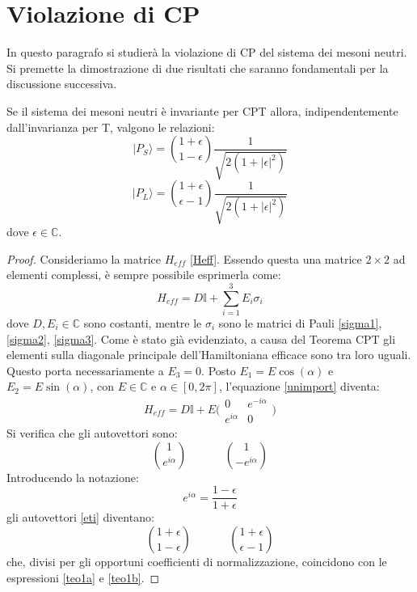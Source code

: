 \section{Violazione di CP}
\noindent
In questo paragrafo si studierà la violazione di CP del sistema dei mesoni neutri. Si premette la dimostrazione di due risultati
che saranno fondamentali per la discussione successiva.
\begin{teorema}
 Se il sistema dei mesoni neutri è invariante per CPT allora, indipendentemente dall'invarianza per T, valgono le relazioni:
\begin{equation}\label{teo1a}
 |P_S\rangle = \binom{1+\epsilon}{1-\epsilon} \frac{1}{\sqrt{2(1+{|\epsilon|}^2)}}
\end{equation}
\begin{equation}\label{teo1b}
 |P_L\rangle = \binom{1+\epsilon}{\epsilon-1} \frac{1}{\sqrt{2(1+{|\epsilon|}^2)}}
\end{equation}
dove $\epsilon \in \mathbb{C}$.
\end{teorema}
\begin{proof}
Consideriamo la matrice $H_{eff}$ \eqref{Heff}. Essendo questa una matrice $2 \times 2$ ad elementi complessi, è sempre possibile esprimerla come:
\begin{equation} \label{unimport}
 H_{eff} = D\mathbb{I} + \sum_{i=1}^{3}E_i\sigma_i
\end{equation}
dove $D, E_i \in \mathbb{C}$ sono costanti, mentre le $\sigma_i$ sono le matrici di Pauli \eqref{sigma1}, \eqref{sigma2}, \eqref{sigma3}.
Come è stato già evidenziato, a causa del Teorema CPT gli elementi sulla diagonale principale dell'Hamiltoniana efficace sono tra loro uguali.
Questo porta necessariamente a $E_3 = 0$.
Posto $E_1 = E \cos (\alpha)$ e $E_2 = E\sin(\alpha)$, con $E \in \mathbb{C}$ e $\alpha \in [0,2\pi]$, l'equazione \eqref{unimport} diventa:
\begin{equation}
 H_{eff} = D\mathbb{I} + E \Bigg(\begin{matrix} 0 & e^{-i\alpha} \\ e^{i\alpha} & 0 \end{matrix}\Bigg)
\end{equation}
Si verifica che gli autovettori sono:
\begin{equation}\label{eti}
 \binom{1}{e^{i\alpha}}\ \ \ \ \ \ \ \ \ \ \ \ \ \ \ \binom{1}{-e^{i\alpha}}
\end{equation}
Introducendo la notazione:
\begin{equation}
 e^{i\alpha} = \frac{1 - \epsilon}{1+\epsilon}
\end{equation}
gli autovettori \eqref{eti} diventano:
\begin{equation}
 \binom{1+\epsilon}{1-\epsilon}\ \ \ \ \ \ \ \ \ \ \ \ \ \ \ \binom{1+\epsilon}{\epsilon-1}
\end{equation}
che, divisi per gli opportuni coefficienti di normalizzazione, coincidono con le espressioni \eqref{teo1a} e \eqref{teo1b}.
\end{proof}
